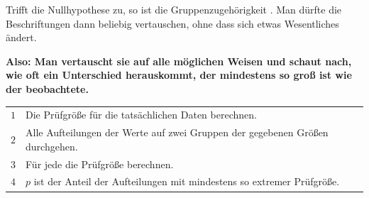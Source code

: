\begin{merksatz}
\begin{center}
\begin{minipage}{0.9\textwidth}
Trifft die Nullhypothese zu, so ist die Gruppenzugehörigkeit . Man dürfte die Beschriftungen dann beliebig vertauschen, ohne dass sich etwas Wesentliches ändert.

\textbf{Also: Man vertauscht sie auf alle möglichen Weisen und schaut nach, wie oft ein Unterschied herauskommt, der mindestens so groß ist wie der beobachtete.}
\end{minipage}
\end{center}

\begin{center}
\renewcommand{\arraystretch}{1.5}
\begin{tabular}{@{}P{1.0cm}P{7.4cm}@{}}
\toprule
$1$ & Die Prüfgröße für die tatsächlichen Daten berechnen.\\
$2$ & Alle Aufteilungen der Werte auf zwei Gruppen der gegebenen Größen durchgehen.\\
$3$ & Für jede die Prüfgröße berechnen.\\
$4$ & $p$ ist der Anteil der Aufteilungen mit mindestens so extremer Prüfgröße.\\
\bottomrule
\end{tabular}
\end{center}
\end{merksatz}

